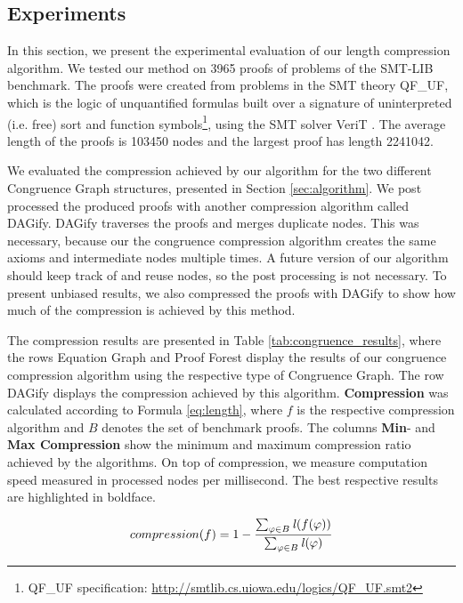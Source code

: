 \subsection{Experiments}
\label{sec:congruence_experiments}

In this section, we present the experimental evaluation of our length compression algorithm.
We tested our method on 3965 proofs of problems of the SMT-LIB benchmark.
The proofs were created from problems in the SMT theory QF\_UF, which is the logic of unquantified formulas built over a signature of uninterpreted (i.e. free) sort and function symbols\footnote{QF\_UF specification: \url{http://smtlib.cs.uiowa.edu/logics/QF\_UF.smt2}}, using the SMT solver VeriT \cite{Bouton2009}.
The average length of the proofs is 103450 nodes and the largest proof has length 2241042.

We evaluated the compression achieved by our algorithm for the two different Congruence Graph structures, presented in Section \ref{sec:algorithm}.
We post processed the produced proofs with another compression algorithm called DAGify.
DAGify traverses the proofs and merges duplicate nodes.
This was necessary, because our the congruence compression algorithm creates the same axioms and intermediate nodes multiple times.
A future version of our algorithm should keep track of and reuse nodes, so the post processing is not necessary.
To present unbiased results, we also compressed the proofs with DAGify to show how much of the compression is achieved by this method.

The compression results are presented in Table \ref{tab:congruence_results}, where the rows Equation Graph and Proof Forest display the results of our congruence compression algorithm using the respective type of Congruence Graph.
The row DAGify displays the compression achieved by this algorithm.
\textbf{Compression} was calculated according to Formula \ref{eq:length}, where $f$ is the respective compression algorithm and $B$ denotes the set of benchmark proofs.
The columns \textbf{Min}- and \textbf{Max Compression} show the minimum and maximum compression ratio achieved by the algorithms.
On top of compression, we measure computation speed measured in processed nodes per millisecond.
The best respective results are highlighted in boldface.

\begin{align}
	compression(f) = 1 - \frac{\sum_{\varphi \in B}{\mathit{l}(f(\varphi))}}{\sum_{\varphi \in B}{\mathit{l}(\varphi)}}
  \label{eq:length}
\end{align}


